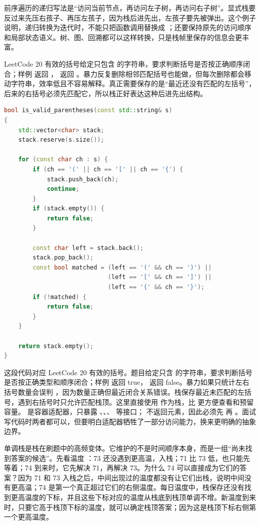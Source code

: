 前序遍历的递归写法是“访问当前节点，再访问左子树，再访问右子树”。显式栈要反过来先压右孩子、再压左孩子，因为栈后进先出，左孩子要先被弹出。这个例子说明，递归转换为迭代时，不能只把函数调用替换成 ；还要保持原先的访问顺序和局部状态语义。树、图、回溯都可以这样转换，只是栈帧里保存的信息会更丰富。

LeetCode 20 有效的括号给定只包含 \code{()[]\{\}} 的字符串，要求判断括号是否按正确顺序闭合；样例  返回 ，\code{"(]"} 返回 。暴力反复删除相邻匹配括号也能做，但每次删除都会移动字符串，效率低且不容易解释。真正需要保存的是“最近还没有匹配的左括号”，后来的右括号必须先匹配它，所以栈正好表达这种后进先出结构。

\begin{lstlisting}[language=C++,caption={LeetCode 20 有效的括号：最近未匹配结构}]
bool is_valid_parentheses(const std::string& s)
{
    std::vector<char> stack;
    stack.reserve(s.size());

    for (const char ch : s) {
        if (ch == '(' || ch == '[' || ch == '{') {
            stack.push_back(ch);
            continue;
        }
        if (stack.empty()) {
            return false;
        }

        const char left = stack.back();
        stack.pop_back();
        const bool matched = (left == '(' && ch == ')') ||
                             (left == '[' && ch == ']') ||
                             (left == '{' && ch == '}');
        if (!matched) {
            return false;
        }
    }

    return stack.empty();
}
\end{lstlisting}

这段代码对应 LeetCode 20 有效的括号。题目给定只含 \code{()[]\{\}} 的字符串，要求判断括号是否按正确类型和顺序闭合；样例  返回 true， 返回 false。暴力如果只统计左右括号数量会误判 ，因为数量正确但最近闭合关系错误。栈保存最近未匹配的左括号，遇到右括号时只允许匹配栈顶。这里直接使用  作为栈，比  更方便查看和预留容量。 是容器适配器，只暴露 、、、 等接口； 不返回元素，因此必须先  再 。面试写代码时两者都可以，但要明白适配器牺牲了一部分访问能力，换来更明确的抽象边界。

单调栈是栈在刷题中的高频变体。它维护的不是时间顺序本身，而是一组“尚未找到答案的候选”。先看温度 \code{[73, 71, 74]}：73 还没遇到更高温，入栈；71 比 73 低，也只能先等着；74 到来时，它先解决 71，再解决 73。为什么 74 可以直接成为它们的答案？因为 71 和 73 入栈之后，中间出现过的温度都没有让它们出栈，说明中间没有更高温；74 是第一个真正超过它们的右侧温度。每日温度中，栈保存还没有找到更高温度的下标，并且这些下标对应的温度从栈底到栈顶单调不增。新温度到来时，只要它高于栈顶下标的温度，就可以确定栈顶答案；因为这是栈顶下标右侧第一个更高温度。

